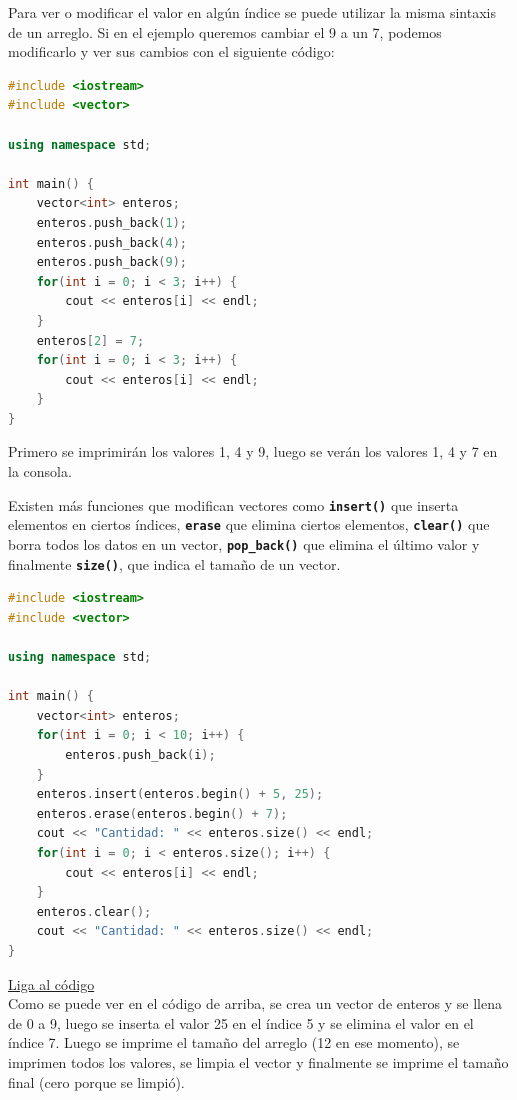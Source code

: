 \documentclass{article}
\begin{document}
Para ver o modificar el valor en algún índice se puede utilizar la misma sintaxis de un arreglo. Si en el ejemplo queremos cambiar el 9 a un 7, podemos modificarlo y ver sus cambios con el siguiente código:

\begin{lstlisting}[language=C++, title=Modificando valores]
#include <iostream>
#include <vector>

using namespace std;

int main() {
	vector<int> enteros;
	enteros.push_back(1);
	enteros.push_back(4);
	enteros.push_back(9);
	for(int i = 0; i < 3; i++) {
		cout << enteros[i] << endl;
	}
	enteros[2] = 7;
	for(int i = 0; i < 3; i++) {
		cout << enteros[i] << endl;
	}
}
\end{lstlisting}

Primero se imprimirán los valores 1, 4 y 9, luego se verán los valores 1, 4 y 7 en la consola.

Existen más funciones que modifican vectores como \textbf{\lstinline{insert()}} que inserta elementos en ciertos índices, \textbf{\lstinline{erase}} que elimina ciertos elementos, \textbf{\lstinline{clear()}} que borra todos los datos en un vector, \textbf{\lstinline{pop_back()}} que elimina el último valor y finalmente \textbf{\lstinline{size()}}, que indica el tamaño de un vector.

\begin{lstlisting}[language=C++, title=Jugando con vectores]
#include <iostream>
#include <vector>

using namespace std;

int main() {
	vector<int> enteros;
	for(int i = 0; i < 10; i++) {
		enteros.push_back(i);
	}
	enteros.insert(enteros.begin() + 5, 25);
	enteros.erase(enteros.begin() + 7);
	cout << "Cantidad: " << enteros.size() << endl;
	for(int i = 0; i < enteros.size(); i++) {
		cout << enteros[i] << endl;
	}
	enteros.clear();
	cout << "Cantidad: " << enteros.size() << endl;
}
\end{lstlisting}
\href{https://repl.it/@Jamesscn/Juego-de-Vectores}{Liga al código}\\

Como se puede ver en el código de arriba, se crea un vector de enteros y se llena de 0 a 9, luego se inserta el valor 25 en el índice 5 y se elimina el valor en el índice 7. Luego se imprime el tamaño del arreglo (12 en ese momento), se imprimen todos los valores, se limpia el vector y finalmente se imprime el tamaño final (cero porque se limpió).
\end{document}
